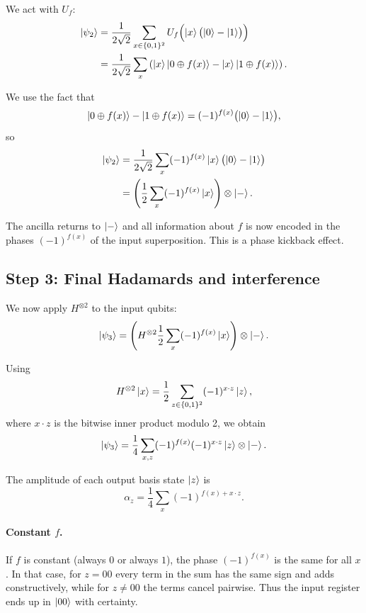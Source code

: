 \documentclass[a4paper,11pt]{article}
\providecommand{\ket}[1]{\mathinner{|{#1}\rangle}}
\begin{document}
We act with $U_f$:
\begin{align}
  \ket{\psi_2} &= \frac{1}{2\sqrt{2}}\sum_{x \in \{0,1\}^2}
     U_f\Bigl(\ket{x}\bigl(\ket{0} - \ket{1}\bigr)\Bigr) \\
  &= \frac{1}{2\sqrt{2}}\sum_{x}
     \left(\ket{x}\ket{0 \oplus f(x)} - \ket{x}\ket{1 \oplus f(x)}\right).
\end{align}

We use the fact that
\[
  \ket{0 \oplus f(x)} - \ket{1 \oplus f(x)} = (-1)^{f(x)}\bigl(\ket{0} - \ket{1}\bigr),
\]
so
\begin{align}
  \ket{\psi_2} &= \frac{1}{2\sqrt{2}}\sum_{x}(-1)^{f(x)}\ket{x}\bigl(\ket{0} - \ket{1}\bigr) \\
  &= \left(\frac{1}{2}\sum_{x}(-1)^{f(x)}\ket{x}\right) \otimes \ket{-}.
\end{align}

The ancilla returns to $\ket{-}$ and all information about $f$ is now encoded in the phases
$(-1)^{f(x)}$ of the input superposition. This is a phase kickback effect.

\subsection*{Step 3: Final Hadamards and interference}

We now apply $H^{\otimes 2}$ to the input qubits:
\begin{equation}
  \ket{\psi_3} = \left(H^{\otimes 2}\frac{1}{2}\sum_{x}(-1)^{f(x)}\ket{x}\right) \otimes \ket{-}.
\end{equation}

Using
\[
  H^{\otimes 2}\ket{x} = \frac{1}{2}\sum_{z \in \{0,1\}^2}(-1)^{x \cdot z}\ket{z},
\]
where $x \cdot z$ is the bitwise inner product modulo 2, we obtain
\begin{equation}
  \ket{\psi_3} = \frac{1}{4}\sum_{x,z}(-1)^{f(x)}(-1)^{x \cdot z}\ket{z} \otimes \ket{-}.
\end{equation}

The amplitude of each output basis state $\ket{z}$ is
\[
  \alpha_z = \frac{1}{4}\sum_{x}(-1)^{f(x) + x \cdot z}.
\]

\paragraph{Constant $f$.}
If $f$ is constant (always $0$ or always $1$), the phase $(-1)^{f(x)}$ is the same for all $x$. In
that case, for $z = 00$ every term in the sum has the same sign and adds constructively, while for
$z \neq 00$ the terms cancel pairwise. Thus the input register ends up in $\ket{00}$ with
certainty.
\end{document}
